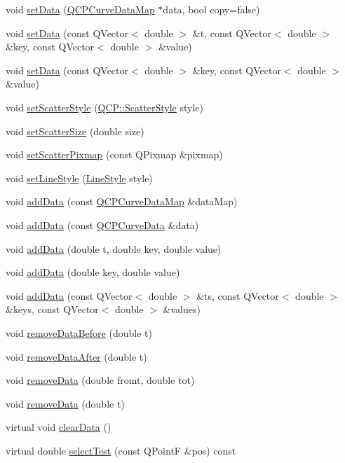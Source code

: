 \begin{DoxyCompactItemize}
\item 
void \hyperlink{classQCPCurve_a631ac886708460013b30052f49cbc9da}{set\-Data} (\hyperlink{qcustomplot_8h_a444d37ec9cb2951b3a7fe443c34d1658}{Q\-C\-P\-Curve\-Data\-Map} $\ast$data, bool copy=false)
\item 
void \hyperlink{classQCPCurve_affe80e011e2ced62a88f614acd6ab8d1}{set\-Data} (const Q\-Vector$<$ double $>$ \&t, const Q\-Vector$<$ double $>$ \&key, const Q\-Vector$<$ double $>$ \&value)
\item 
void \hyperlink{classQCPCurve_a963d4c45777deef15848a8f56172d066}{set\-Data} (const Q\-Vector$<$ double $>$ \&key, const Q\-Vector$<$ double $>$ \&value)
\item 
void \hyperlink{classQCPCurve_a478a6f67c135f354c0401ba01fc088a0}{set\-Scatter\-Style} (\hyperlink{namespaceQCP_af66d0711d42fe78d96c28abadc67f26f}{Q\-C\-P\-::\-Scatter\-Style} style)
\item 
void \hyperlink{classQCPCurve_acbb799ad22e8b78b1abe58bae2a4c413}{set\-Scatter\-Size} (double size)
\item 
void \hyperlink{classQCPCurve_aa34367ca7fe302477929078187de26ff}{set\-Scatter\-Pixmap} (const Q\-Pixmap \&pixmap)
\item 
void \hyperlink{classQCPCurve_a4a377ec863ff81a1875c3094a6177c19}{set\-Line\-Style} (\hyperlink{classQCPCurve_a2710e9f79302152cff794c6e16cc01f1}{Line\-Style} style)
\item 
void \hyperlink{classQCPCurve_a4e24023c3b9ac75440c7a260172c99af}{add\-Data} (const \hyperlink{qcustomplot_8h_a444d37ec9cb2951b3a7fe443c34d1658}{Q\-C\-P\-Curve\-Data\-Map} \&data\-Map)
\item 
void \hyperlink{classQCPCurve_ad304326aba096911f92452d8bfe0470e}{add\-Data} (const \hyperlink{classQCPCurveData}{Q\-C\-P\-Curve\-Data} \&data)
\item 
void \hyperlink{classQCPCurve_a13398b236f6926014e404eeb5b9f415c}{add\-Data} (double t, double key, double value)
\item 
void \hyperlink{classQCPCurve_ada4762e793cd5707b33f35b8a4b0f8fb}{add\-Data} (double key, double value)
\item 
void \hyperlink{classQCPCurve_a27c8b3dddd4067d626397ee199626722}{add\-Data} (const Q\-Vector$<$ double $>$ \&ts, const Q\-Vector$<$ double $>$ \&keys, const Q\-Vector$<$ double $>$ \&values)
\item 
void \hyperlink{classQCPCurve_af6f4284fbc2f34e676f24dce03c34fe5}{remove\-Data\-Before} (double t)
\item 
void \hyperlink{classQCPCurve_a0365cb947c4e6d405ee22e00191d5f52}{remove\-Data\-After} (double t)
\item 
void \hyperlink{classQCPCurve_ad45bb5479be799163028ef2b776f7221}{remove\-Data} (double fromt, double tot)
\item 
void \hyperlink{classQCPCurve_a30c91acfa591ec534c49fed4c0fca39a}{remove\-Data} (double t)
\item 
virtual void \hyperlink{classQCPCurve_ae0462c61dbfbac07db0736ec64110241}{clear\-Data} ()
\item 
virtual double \hyperlink{classQCPCurve_a01f92730eb23ad5b222be95f2b7aa500}{select\-Test} (const Q\-Point\-F \&pos) const 
\end{DoxyCompactItemize}
